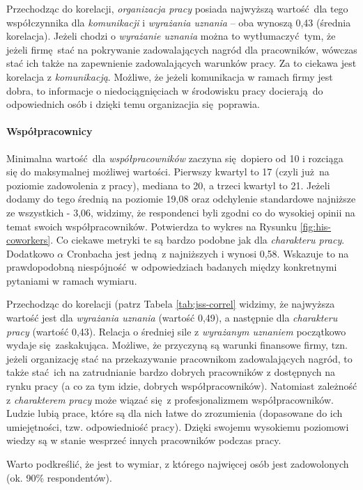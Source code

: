 Przechodząc do korelacji, \textit{organizacja pracy} posiada najwyższą wartość dla tego współczynnika dla \textit{komunikacji} i \textit{wyrażania uznania} -- oba wynoszą 0,43 (średnia korelacja). Jeżeli chodzi o \textit{wyrażanie uznania} można to wytłumaczyć tym, że jeżeli firmę stać na pokrywanie zadowalających nagród dla pracowników, wówczas stać ich także na zapewnienie zadowalających warunków pracy. Za to ciekawa jest korelacja z \textit{komunikacją}. Możliwe, że jeżeli komunikacja w ramach firmy jest dobra, to informacje o niedociągnięciach w
środowisku pracy docierają do odpowiednich osób i dzięki temu organizacjia się poprawia. 

\paragraph{Współpracownicy} Minimalna wartość dla \textit{współpracowników} zaczyna się dopiero od 10 i rozciąga się do maksymalnej możliwej wartości. Pierwszy kwartyl to 17 (czyli już na poziomie zadowolenia z pracy), mediana to 20, a trzeci kwartyl to 21. Jeżeli dodamy do tego średnią na poziomie 19,08 oraz odchylenie standardowe najniższe ze wszystkich - 3,06, widzimy, że respondenci byli zgodni co do wysokiej opinii na temat swoich współpracowników. Potwierdza to wykres
na Rysunku \ref{fig:his-coworkers}. Co ciekawe metryki te są bardzo podobne jak dla \textit{charakteru pracy}. Dodatkowo $\alpha$ Cronbacha jest jedną z najniższych i wynosi 0,58. Wskazuje to na prawdopodobną niespójność w odpowiedziach badanych między konkretnymi pytaniami w ramach wymiaru.

Przechodząc do korelacji (patrz Tabela \ref{tab:jss-correl} widzimy, że najwyższa wartość jest dla \textit{wyrażania uznania} (wartość 0,49), a następnie dla \textit{charakteru pracy} (wartość 0,43). Relacja o średniej sile z \textit{wyrażanym uznaniem} początkowo wydaje się zaskakująca. Możliwe, że przyczyną są warunki finansowe firmy, tzn. jeżeli organizację stać na przekazywanie pracownikom zadowalających nagród, to także stać ich na zatrudnianie bardzo dobrych pracowników z dostępnych
na rynku pracy (a co za tym idzie, dobrych współpracowników). Natomiast zależność z \textit{charakterem pracy} może wiązać się z profesjonalizmem współpracowników. Ludzie lubią prace, które są dla nich łatwe do zrozumienia (dopasowane do ich umiejętności, tzw. odpowiedniość pracy). Dzięki swojemu wysokiemu poziomowi wiedzy są w stanie wesprzeć innych pracowników podczas pracy.

Warto podkreślić, że jest to wymiar, z którego najwięcej osób jest zadowolonych (ok. 90\% respondentów).

